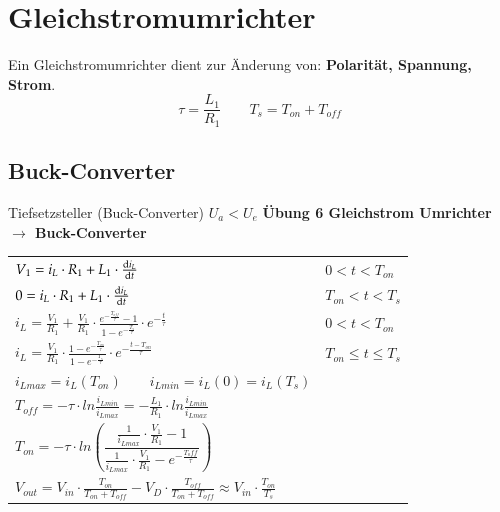 \section{Gleichstromumrichter}
Ein Gleichstromumrichter dient zur Änderung von: \textbf{Polarität, Spannung, Strom}.\newline
\vspace{-0.2cm}
\[ \tau=\frac{L_1}{R_1} \qquad T_s=T_{on} + T_{off}\]
\vspace{-1cm}
\subsection{Buck-Converter}
\begin{minipage}{0.75\linewidth}
    Tiefsetzsteller (Buck-Converter) $U_a < U_e  $\newline
    \textbf{Übung 6 Gleichstrom Umrichter $ \rightarrow $ Buck-Converter}\newline
    \renewcommand{\arraystretch}{2}
    \begin{tabular}{p{9cm} p{3cm}}
        $ V_1 = i_L\cdot R_1+L_1\cdot\frac{\mathop{}\!\mathrm{d} i_L}{\mathop{}\!\mathrm{d} t} $ &
        $ 0<t<T_{on} $
        \\  
        $ 0 = i_L\cdot R_1+L_1\cdot\frac{\mathop{}\!\mathrm{d} i_L}{\mathop{}\!\mathrm{d} t}$ & $T_{on}<t<T_{s} $
        \\  
        $ i_L=\frac{V_1}{R_1}+ \frac{V_1}{R_1}\cdot \frac{e^{-\frac{T_{off}}{\tau}}-1}{1-e^{-\frac{T_{s}}{\tau}}}\cdot e^{-\frac{t}{\tau}}$ &
        $ 0<t<T_{on}  $
        \\  
        $ i_L=\frac{V_1}{R_1}\cdot \frac{1-e^{-\frac{T_{on}}{\tau}}}{1-e^{-\frac{T_{s}}{\tau}}}\cdot e^{-\frac{t-T_{on}}{\tau}}$ &
        $ T_{on}\leq t \leq T_{s}  $
        \\ 
        $ i_{Lmax} = i_L(T_{on}) \qquad i_{Lmin} = i_L(0) = i_L(T_s) $    
        & \\ 
        $ T_{off}=-\tau \cdot ln\frac{i_{Lmin}}{i_{Lmax}}= -\frac{L_1}{R_1}\cdot ln\frac{i_{Lmin}}{i_{Lmax}} $
        & \\    
        $ T_{on}=-\tau \cdot ln\left(\dfrac{\frac{1}{i_{Lmax}}\cdot\frac{V_1}{R_1}-1}{\frac{1}{i_{Lmax}}\cdot \frac{V_1}{R_1}-e^{-\frac{T_off}{\tau}}}\right) $
        & \\ 
        $ V_{out}=V_{in}\cdot \frac{T_{on}}{T_{on}+T_{off}}-V_D\cdot\frac{T_{off}}{T_{on}+T_{off}} \approx V_{in}\cdot\frac{T_{on}}{T_s} $
        & \\ 
    \end{tabular}
    \newline
    \renewcommand{\arraystretch}{1}
\end{minipage}
